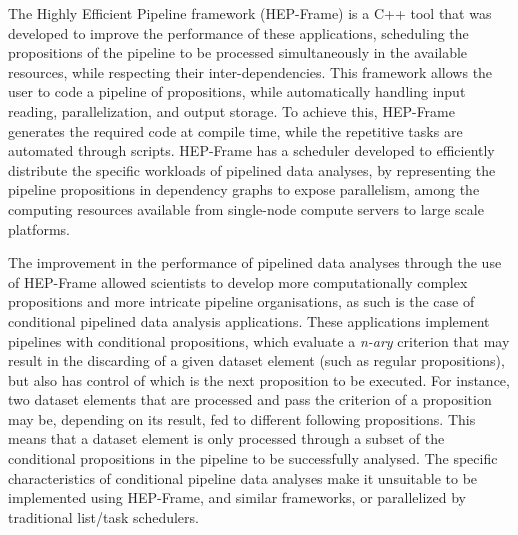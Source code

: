 The Highly Efficient Pipeline framework (HEP-Frame) is a C++ tool that was developed to improve the performance of these applications, scheduling the propositions of the pipeline to be processed simultaneously in the available resources, while respecting their inter-dependencies.
This framework allows the user to code a pipeline of propositions, while automatically handling input reading, parallelization, and output storage.
To achieve this, HEP-Frame generates the required code at compile time, while the repetitive tasks are automated through scripts.
HEP-Frame has a scheduler developed to efficiently distribute the specific workloads of pipelined data analyses, by representing the pipeline propositions in dependency graphs to expose parallelism, among the computing resources available from single-node compute servers to large scale platforms.

The improvement in the performance of pipelined data analyses through the use of HEP-Frame allowed scientists to develop more computationally complex propositions and more intricate pipeline organisations, as such is the case of conditional pipelined data analysis applications.
These applications implement pipelines with conditional propositions, which evaluate a \textit{n-ary} criterion that may result in the discarding of a given dataset element (such as regular propositions), but also has control of which is the next proposition to be executed.
For instance, two dataset elements that are processed and pass the criterion of a proposition may be, depending on its result, fed to different following propositions.
This means that a dataset element is only processed through a subset of the conditional propositions in the pipeline to be successfully analysed.
The specific characteristics of conditional pipeline data analyses make it unsuitable to be implemented using HEP-Frame, and similar frameworks, or parallelized by traditional list/task schedulers.







